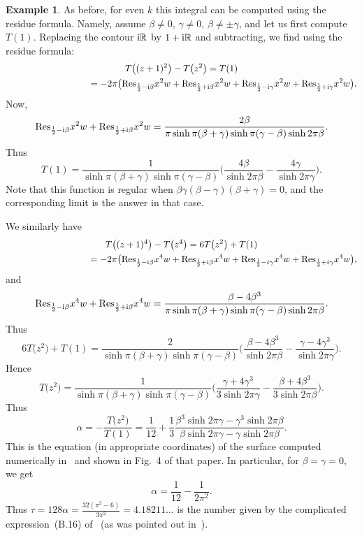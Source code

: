 \documentclass[pdftex]{sigma}
\theoremstyle{definition}
\newtheorem{Example}[Theorem]{Example}
\numberwithin{equation}{section}
\begin{document}
\begin{Example}
As before, for even $k$ this integral can be computed using the residue formula. Namely, assume $\beta\ne 0$, $\gamma\ne 0$, $\beta\ne \pm \gamma$, and let us first compute $T(1)$. Replacing the contour ${\rm i}\mathbb R$ by $1+{\rm i}\mathbb R$ and subtracting, we find using the residue formula:
\begin{gather*}
T\big((z+1)^2\big)-T\big(z^2\big)=T(1)
\\ \hphantom{T\big((z+1)^2\big)-T\big(z^2\big)}
{}=-2\pi\big({\rm Res}_{\frac{1}{2}-{\rm i}\beta }x^2w+{\rm Res}_{\frac{1}{2}+{\rm i}\beta }x^2w+{\rm Res}_{\frac{1}{2}-{\rm i}\gamma}x^2w+{\rm Res}_{\frac{1}{2}+{\rm i}\gamma}x^2w\big).
\end{gather*}
Now,
\[
{\rm Res}_{\frac{1}{2}-{\rm i}\beta }x^2w+{\rm Res}_{\frac{1}{2}+{\rm i}\beta }x^2w=\frac{2\beta}{\pi \sinh \pi(\beta+\gamma)\sinh\pi(\gamma-\beta)\sinh 2\pi \beta}.
\]
Thus
\[
T(1)=\frac{1}{\sinh \pi(\beta+\gamma)\sinh\pi(\gamma-\beta)}\bigg(\frac{4\beta}{\sinh 2\pi \beta}-\frac{4\gamma}{\sinh 2\pi \gamma}\bigg).
\]
Note that this function is regular when $\beta\gamma(\beta-\gamma)(\beta+\gamma)=0$, and the corresponding limit is the answer in that case.

We similarly have
\begin{gather*}
T\big((z+1)^4\big)-T\big(z^4\big)=6T\big(z^2\big)+T(1)
\\ \hphantom{T\big((z+1)^4\big)-T\big(z^4\big)}
{}=-2\pi\big({\rm Res}_{\frac{1}{2}-{\rm i}\beta }x^4w+{\rm Res}_{\frac{1}{2}+{\rm i}\beta }x^4w+{\rm Res}_{\frac{1}{2}-i\gamma}x^4w+{\rm Res}_{\frac{1}{2}+i\gamma}x^4w\big),
\end{gather*}
and
\[
{\rm Res}_{\frac{1}{2}-{\rm i}\beta }x^4w+{\rm Res}_{\frac{1}{2}+{\rm i}\beta }x^4w=\frac{\beta-4\beta^3}{\pi \sinh \pi(\beta+\gamma)\sinh\pi(\gamma-\beta)\sinh 2\pi \beta}.
\]
Thus
\[
6T\big(z^2\big)+T(1)=\frac{2}{\sinh \pi(\beta+\gamma)\sinh\pi(\gamma-\beta)}\bigg(\frac{\beta-4\beta^3}{\sinh 2\pi \beta}-\frac{\gamma-4\gamma^3}{\sinh 2\pi \gamma}\bigg).
\]
Hence
\[
T\big(z^2\big)=\frac{1}{\sinh \pi(\beta+\gamma)\sinh\pi(\gamma-\beta)}\bigg(\frac{\gamma+4\gamma^3}{3\sinh 2\pi \gamma}-\frac{\beta+4\beta^3}{3\sinh 2\pi \beta}\bigg).
\]
Thus
\[
\alpha=-\frac{T\big(z^2\big)}{T(1)}=\frac{1}{12}+\frac{1}{3}\frac{\beta^3\sinh 2\pi \gamma-\gamma^3\sinh 2\pi \beta}{\beta\sinh 2\pi \gamma-\gamma\sinh 2\pi \beta}.
\]
This is the equation (in appropriate coordinates) of the surface computed numerically in~\cite{BPR} and shown in Fig.~4 of that paper.
In particular, for $\beta=\gamma=0$, we get
\[
\alpha=\frac{1}{12}-\frac{1}{2\pi^2}.
\]
Thus $\tau=128\alpha=\frac{32(\pi^2-6)}{3\pi^2}=4.18211{\dots}$
is the number given by the complicated expres\-sion~(B.16) of~\cite{BPR}
(as was pointed out in~\cite{DPY}).
\end{Example}
\end{document}
